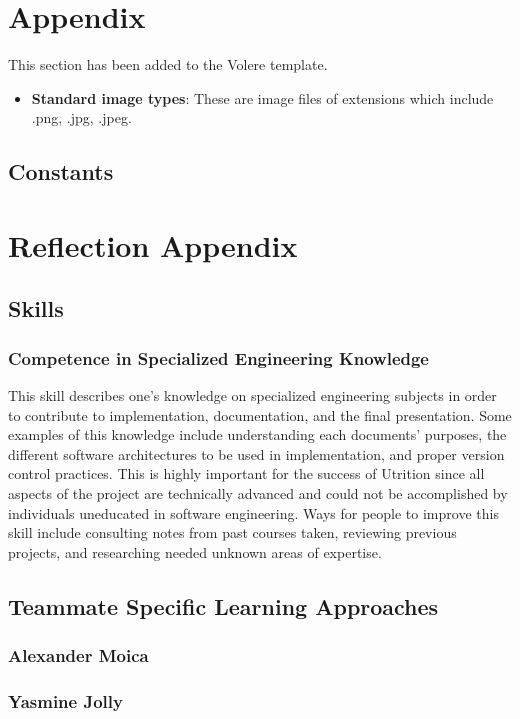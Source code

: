 \documentclass[12pt]{article}
\begin{document}
\section{Appendix}
This section has been added to the Volere template.
\begin{itemize}
	\item \textbf{Standard image types}: These are image files of extensions which include .png, .jpg, .jpeg.
\end{itemize}

\subsection{Constants}

\section{Reflection Appendix}
\subsection{Skills}
\subsubsection{Competence in Specialized Engineering Knowledge}
This skill describes one's knowledge on specialized engineering subjects in order to contribute to implementation, documentation, and the final presentation. Some examples of this knowledge include understanding each documents' purposes, the different software architectures to be used in implementation, and proper version control practices. This is highly important for the success of Utrition since all aspects of the project are technically advanced and could not be accomplished by individuals uneducated in software engineering. Ways for people to improve this skill include consulting notes from past courses taken, reviewing previous projects, and researching needed unknown areas of expertise.

\subsection{Teammate Specific Learning Approaches}
\subsubsection{Alexander Moica}
\subsubsection{Yasmine Jolly}
\end{document}
